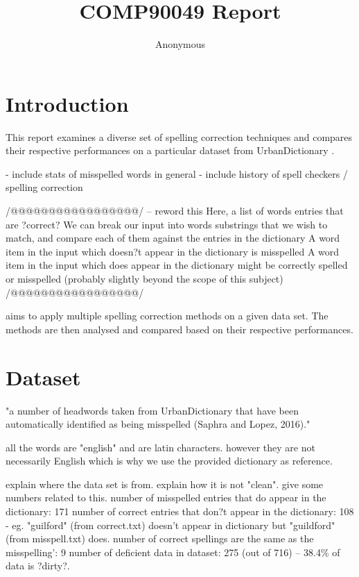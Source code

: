 \documentclass[11pt]{article}
\title{COMP90049 Report}
\author
{Anonymous}
\begin{document}
\maketitle



\section{Introduction}

This report examines a diverse set of spelling correction techniques and compares their respective performances on a particular dataset from UrbanDictionary \cite{JOURNAL:1}.

- include stats of misspelled words in general 
- include history of spell checkers / spelling correction 


/@@@@@@@@@@@@@@@@@/ -- reword this
Here, a list of words entries that are ?correct?
We can break our input into words substrings that we wish to match, and compare each of them against the entries in the dictionary
A word item in the input which doesn?t appear in the dictionary is misspelled
A word item in the input which does appear in the dictionary might be correctly spelled or misspelled (probably slightly beyond the scope of this subject)
/@@@@@@@@@@@@@@@@@/

aims to apply multiple spelling correction methods on a given data set. The methods are then analysed and compared based on their respective performances.

\section{Dataset}

"a number of headwords taken from UrbanDictionary that have been automatically identified as being misspelled (Saphra and Lopez, 2016)."

all the words are "english" and are latin characters. however they are not necessarily English which is why we use the provided dictionary  as reference.

explain where the data set is from. explain how it is not "clean". give some numbers related to this.
number of misspelled entries that do appear in the dictionary: 171
number of correct entries that don?t appear in the dictionary: 108
- eg. "guilford" (from correct.txt) doesn't appear in dictionary but "guildford" (from misspell.txt) does.
number of correct spellings are the same as the misspelling': 9
number of deficient data in dataset: 275 (out of 716) -- 38.4\% of data is ?dirty?.
\end{document}
